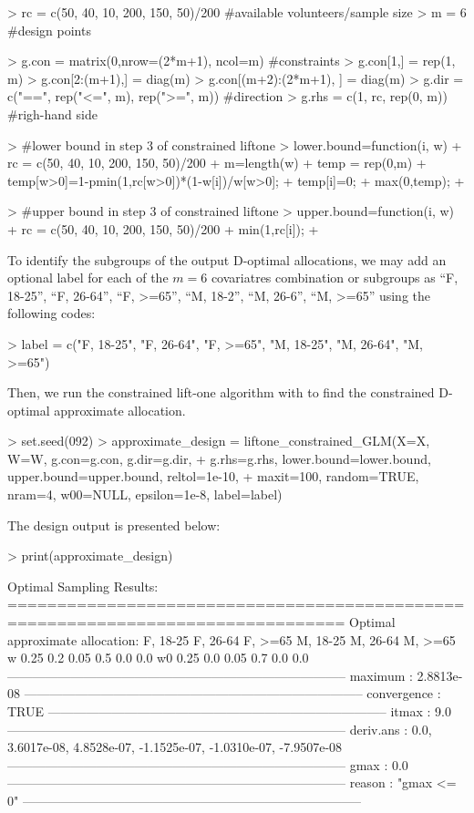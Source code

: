 \begin{example}
> rc = c(50, 40, 10, 200, 150, 50)/200 #available volunteers/sample size
> m = 6 #design points

> g.con = matrix(0,nrow=(2*m+1), ncol=m) #constraints
> g.con[1,] = rep(1, m)
> g.con[2:(m+1),] = diag(m)
> g.con[(m+2):(2*m+1), ] = diag(m)
> g.dir = c("==", rep("<=", m), rep(">=", m)) #direction
> g.rhs = c(1, rc, rep(0, m)) #righ-hand side

> #lower bound in step 3 of constrained liftone
> lower.bound=function(i, w){
+   rc = c(50, 40, 10, 200, 150, 50)/200
+   m=length(w)
+   temp = rep(0,m)
+   temp[w>0]=1-pmin(1,rc[w>0])*(1-w[i])/w[w>0];
+   temp[i]=0;
+   max(0,temp);
+   }

> #upper bound in step 3 of constrained liftone
> upper.bound=function(i, w){
+   rc = c(50, 40, 10, 200, 150, 50)/200
+   min(1,rc[i]);
+   }
\end{example}

To identify the subgroups of the output D-optimal allocations, we may add an optional label for each of the $m=6$ covariatres combination or subgroups as ``F, 18-25'',  ``F, 26-64'', ``F, >=65'', ``M, 18-2'', ``M, 26-6'', ``M, >=65'' using the following codes:

\begin{example}
> label = c("F, 18-25", "F, 26-64", "F, >=65", "M, 18-25", "M, 26-64", "M, >=65")
\end{example}

Then, we run the constrained lift-one algorithm with \texttt{} to find the constrained D-optimal approximate allocation.
\begin{example}
> set.seed(092)
> approximate_design = liftone_constrained_GLM(X=X, W=W, g.con=g.con, g.dir=g.dir,
+ g.rhs=g.rhs, lower.bound=lower.bound, upper.bound=upper.bound, reltol=1e-10,
+ maxit=100, random=TRUE, nram=4, w00=NULL, epsilon=1e-8, label=label)
\end{example}
The design output is presented below:

\begin{example}
> print(approximate_design)

Optimal Sampling Results:
================================================================================
Optimal approximate allocation:
   F, 18-25 F, 26-64 F, >=65 M, 18-25 M, 26-64 M, >=65
w  0.25     0.2      0.05    0.5      0.0      0.0
w0 0.25     0.0      0.05    0.7      0.0      0.0
--------------------------------------------------------------------------------
maximum :
2.8813e-08
--------------------------------------------------------------------------------
convergence :
TRUE
--------------------------------------------------------------------------------
itmax :
9.0
--------------------------------------------------------------------------------
deriv.ans :
0.0, 3.6017e-08, 4.8528e-07, -1.1525e-07, -1.0310e-07, -7.9507e-08
--------------------------------------------------------------------------------
gmax :
0.0
--------------------------------------------------------------------------------
reason :
"gmax <= 0"
--------------------------------------------------------------------------------
\end{example}

